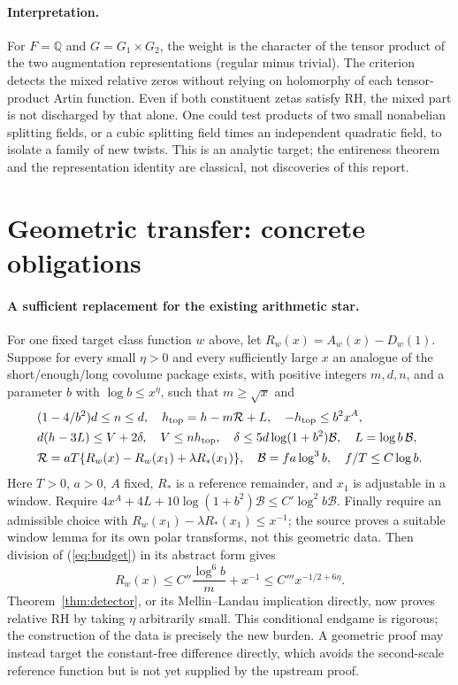 \documentclass[11pt]{article}
\theoremstyle{remark}\newtheorem{remark}[theorem]{Remark}
\newcommand{\Q}{\mathbb Q}\newcommand{\C}{\mathbb C}\newcommand{\R}{\mathbb R}\newcommand{\ind}{\mathbf 1}\newcommand{\ord}{\operatorname{ord}}\newcommand{\Rea}{\operatorname{Re}}
\begin{document}
\paragraph{Interpretation.} For $F=\Q$ and $G=G_1\times G_2$, the weight is the character of the tensor product of the two augmentation representations (regular minus trivial). The criterion detects the mixed relative zeros without relying on holomorphy of each tensor-product Artin function. Even if both constituent zetas satisfy RH, the mixed part is not discharged by that alone. One could test products of two small nonabelian splitting fields, or a cubic splitting field times an independent quadratic field, to isolate a family of new twists. This is an analytic target; the entireness theorem and the representation identity are classical, not discoveries of this report.

\section{Geometric transfer: concrete obligations}
\paragraph{A sufficient replacement for the existing arithmetic star.}
For one fixed target class function $w$ above, let $R_w(x)=A_w(x)-D_w(1)$. Suppose for every small $\eta>0$ and every sufficiently large $x$ an analogue of the short/enough/long covolume package exists, with positive integers $m,d,n$, and a parameter $b$ with $\log b\le x^\eta$, such that $m\ge\sqrt{x}$ and
\begin{align*}
 &(1-4/b^2)d\le n\le d,\quad h_{\rm top}=h-m\mathcal R+L,\quad -h_{\rm top}\le b^2x^A,\\
 &d(h-3L)\le V+2\delta,\quad V\le n h_{\rm top},\quad
  \delta\le5d\log(1+b^2)\mathcal B,\quad L=\log b\,\mathcal B,\\
 &\mathcal R=aT\{R_w(x)-R_w(x_1)+\lambda R_*(x_1)\},\quad
  \mathcal B=fa\log^3 b,\quad f/T\le C\log b.
\end{align*}
Here $T>0$, $a>0$, $A$ fixed, $R_*$ is a reference remainder, and $x_1$ is adjustable in a window. Require $4x^A+4L+10\log(1+b^2)\mathcal B\le C'\log^2 b\mathcal B$. Finally require an admissible choice with $R_w(x_1)-\lambda R_*(x_1)\le x^{-1}$; the source proves a suitable window lemma for its own polar transforms, not this geometric data. Then division of (\ref{eq:budget}) in its abstract form gives
\[
 R_w(x)\le C''\frac{\log^6 b}{m}+x^{-1}\le C''' x^{-1/2+6\eta}.
\]
Theorem~\ref{thm:detector}, or its Mellin--Landau implication directly, now proves relative RH by taking $\eta$ arbitrarily small. This conditional endgame is rigorous; the construction of the data is precisely the new burden. A geometric proof may instead target the constant-free difference directly, which avoids the second-scale reference function but is not yet supplied by the upstream proof.
\end{document}
